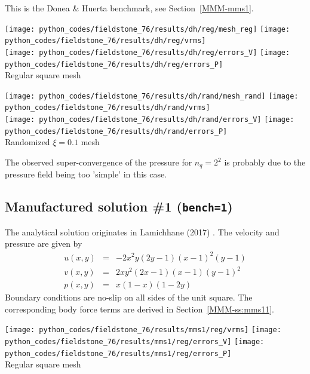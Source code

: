 This is the Donea \& Huerta benchmark, see Section~\ref{MMM-mms1}.

\begin{center}
\texttt{[image: python\_codes/fieldstone\_76/results/dh/reg/mesh\_reg]}
\texttt{[image: python\_codes/fieldstone\_76/results/dh/reg/vrms]}\\
\texttt{[image: python\_codes/fieldstone\_76/results/dh/reg/errors\_V]}
\texttt{[image: python\_codes/fieldstone\_76/results/dh/reg/errors\_P]}\\
{\captionfont Regular square mesh}
\end{center}

\begin{center}
\texttt{[image: python\_codes/fieldstone\_76/results/dh/rand/mesh\_rand]}
\texttt{[image: python\_codes/fieldstone\_76/results/dh/rand/vrms]}\\
\texttt{[image: python\_codes/fieldstone\_76/results/dh/rand/errors\_V]}
\texttt{[image: python\_codes/fieldstone\_76/results/dh/rand/errors\_P]}\\
{\captionfont Randomized $\xi=0.1$ mesh}
\end{center}

The observed super-convergence of the pressure for $n_q=2^2$ is probably due to the 
pressure field being too 'simple' in this case.

\subsection*{Manufactured solution \#1 ({\tt bench=1})}

The analytical solution originates in Lamichhane (2017) \cite{lami17}.
The velocity and pressure are given by
\begin{eqnarray}
u(x,y)&=&-2x^2y(2y-1)(x-1)^2(y-1) \\
v(x,y)&=& 2xy^2(2x-1)(x-1)(y-1)^2 \\
p(x,y)&=& x(1-x)(1-2y)
\end{eqnarray}
Boundary conditions are no-slip on all sides of the unit square. 
The corresponding body force terms are derived in Section~\ref{MMM-ss:mms11}. 

\begin{center}
\texttt{[image: python\_codes/fieldstone\_76/results/mms1/reg/vrms]}
\texttt{[image: python\_codes/fieldstone\_76/results/mms1/reg/errors\_V]}
\texttt{[image: python\_codes/fieldstone\_76/results/mms1/reg/errors\_P]}\\
{\captionfont Regular square mesh}
\end{center}

